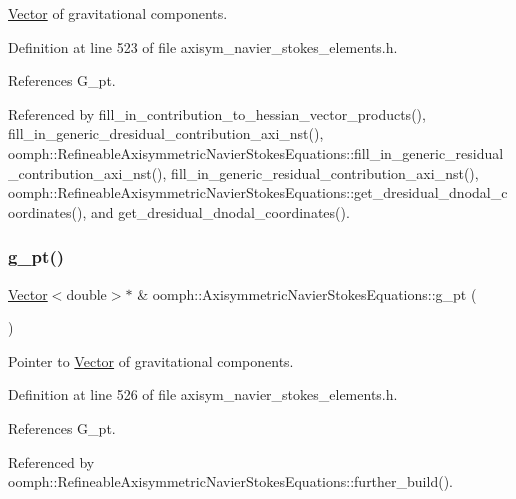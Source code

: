 \hyperlink{classoomph_1_1Vector}{Vector} of gravitational components. 



Definition at line 523 of file axisym\+\_\+navier\+\_\+stokes\+\_\+elements.\+h.



References G\+\_\+pt.



Referenced by fill\+\_\+in\+\_\+contribution\+\_\+to\+\_\+hessian\+\_\+vector\+\_\+products(), fill\+\_\+in\+\_\+generic\+\_\+dresidual\+\_\+contribution\+\_\+axi\+\_\+nst(), oomph\+::\+Refineable\+Axisymmetric\+Navier\+Stokes\+Equations\+::fill\+\_\+in\+\_\+generic\+\_\+residual\+\_\+contribution\+\_\+axi\+\_\+nst(), fill\+\_\+in\+\_\+generic\+\_\+residual\+\_\+contribution\+\_\+axi\+\_\+nst(), oomph\+::\+Refineable\+Axisymmetric\+Navier\+Stokes\+Equations\+::get\+\_\+dresidual\+\_\+dnodal\+\_\+coordinates(), and get\+\_\+dresidual\+\_\+dnodal\+\_\+coordinates().

\mbox{\label{classoomph_1_1AxisymmetricNavierStokesEquations_ac3d87734f99afe1ea996aa66e8211693}} 
\subsubsection{\texorpdfstring{g\+\_\+pt()}{g\_pt()}}
{\footnotesize\ttfamily \hyperlink{classoomph_1_1Vector}{Vector}$<$double$>$$\ast$ \& oomph\+::\+Axisymmetric\+Navier\+Stokes\+Equations\+::g\+\_\+pt (\begin{DoxyParamCaption}{ }\end{DoxyParamCaption})\hspace{0.3cm}{\ttfamily [inline]}}



Pointer to \hyperlink{classoomph_1_1Vector}{Vector} of gravitational components. 



Definition at line 526 of file axisym\+\_\+navier\+\_\+stokes\+\_\+elements.\+h.



References G\+\_\+pt.



Referenced by oomph\+::\+Refineable\+Axisymmetric\+Navier\+Stokes\+Equations\+::further\+\_\+build().

